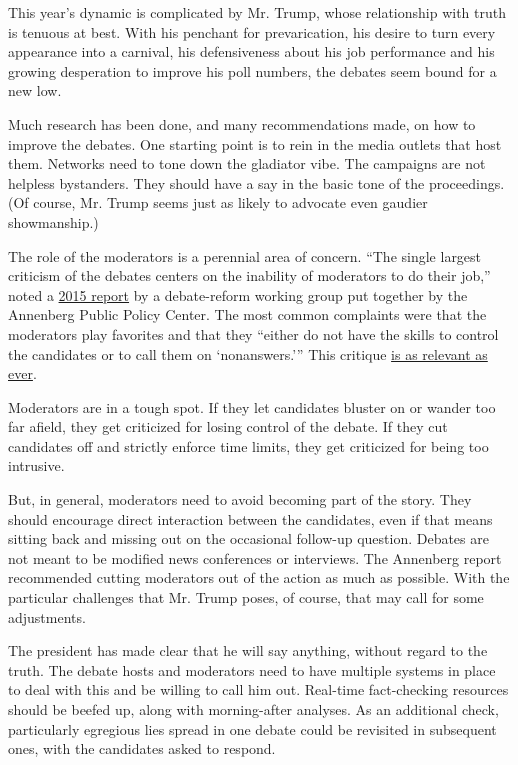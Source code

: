 This year's dynamic is complicated by Mr. Trump, whose relationship with
truth is tenuous at best. With his penchant for prevarication, his
desire to turn every appearance into a carnival, his defensiveness about
his job performance and his growing desperation to improve his poll
numbers, the debates seem bound for a new low.

Much research has been done, and many recommendations made, on how to
improve the debates. One starting point is to rein in the media outlets
that host them. Networks need to tone down the gladiator vibe. The
campaigns are not helpless bystanders. They should have a say in the
basic tone of the proceedings. (Of course, Mr. Trump seems just as
likely to advocate even gaudier showmanship.)

The role of the moderators is a perennial area of concern. ``The single
largest criticism of the debates centers on the inability of moderators
to do their job,'' noted a
\href{http://cdn.annenbergpublicpolicycenter.org/wp-content/uploads/Democratizing-The-Debates.pdf}{2015
report} by a debate-reform working group put together by the Annenberg
Public Policy Center. The most common complaints were that the
moderators play favorites and that they ``either do not have the skills
to control the candidates or to call them on `nonanswers.''' This
critique
\href{https://www.washingtonpost.com/lifestyle/media/the-moderators-let-the-democratic-debate-spiral-into-chaos-and-crosstalk-there-must-be-a-better-way/2020/02/26/e735c61c-5893-11ea-9b35-def5a027d470_story.html}{is
as relevant as ever}.

Moderators are in a tough spot. If they let candidates bluster on or
wander too far afield, they get criticized for losing control of the
debate. If they cut candidates off and strictly enforce time limits,
they get criticized for being too intrusive.

But, in general, moderators need to avoid becoming part of the story.
They should encourage direct interaction between the candidates, even if
that means sitting back and missing out on the occasional follow-up
question. Debates are not meant to be modified news conferences or
interviews. The Annenberg report recommended cutting moderators out of
the action as much as possible. With the particular challenges that Mr.
Trump poses, of course, that may call for some adjustments.

The president has made clear that he will say anything, without regard
to the truth. The debate hosts and moderators need to have multiple
systems in place to deal with this and be willing to call him out.
Real-time fact-checking resources should be beefed up, along with
morning-after analyses. As an additional check, particularly egregious
lies spread in one debate could be revisited in subsequent ones, with
the candidates asked to respond.

